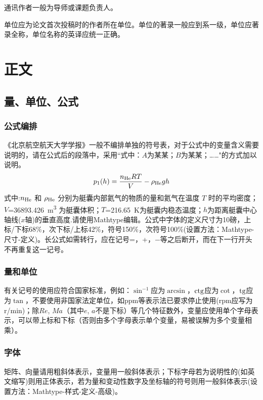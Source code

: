 \documentclass[10.5pt,twocolumn]{aaas}
\begin{document}
通讯作者一般为导师或课题负责人。

单位应为论文首次投稿时的作者所在单位。单位的著录一般应到系一级，单位应著录全称，单位名称的英译应统一正确。

\section{正文}
\subsection{量、单位、公式}
\subsubsection{公式编排}
\label{labSecForm}
《北京航空航天大学学报》一般不编排单独的符号表，对于公式中的变量含义需要说明的，请在公式后的段落中，采用``式中：$A$为某某；$B$为某某；……"的方式加以说明。
\begin{equation}
\label{eqnLabelp}
p_1 (h) = \dfrac{n_{\textnormal{He}}RT}{V}-\rho_{\textnormal{He}}gh
\end{equation}
式中:$n_{\textnormal{He}}$ 和 $\rho_{\textnormal{He}}$ 分别为艇囊内部氦气的物质的量和氦气在温度 $T$ 时的平均密度；
$V$=\SI{36893.426}{\cubic\meter}%
为艇囊体积；$T$=\SI{216.65}{\kelvin}为艇囊内稳态温度；$h$为距离艇囊中心轴线($x$轴)的垂直高度.请使用Mathtype编辑。公式中字体的定义尺寸为10磅，上标/下标68\%，次下标/上标42\%，符号150\%，次符号100\%(设置方法：Mathtype-尺寸-定义)。长公式如需转行，应在记号=，+，$-$等之后断开，而在下一行开头不再重复这一记号。

\subsubsection{量和单位}
有关记号的使用应符合国家标准，例如：$\sin^{-1}$应为$\arcsin$，$\rm ctg$应为$\cot$，$\rm tg$应为$\tan$，不要使用非国家法定单位，如ppm等表示法已要求停止使用(rpm应写为r/min)；除$Re$, $Ma$（其中$e$, $a$不是下标）等几个特征数外，变量应使用单个字母表示，可以带上标和下标（否则由多个字母表示单个变量，易被误解为多个变量相乘）。

\subsubsection{字体}
矩阵、向量请用粗斜体表示，变量用一般斜体表示；下标字母若为说明性的(如英文缩写)则用正体表示，若为量和变动性数字及坐标轴的符号则用一般斜体表示(设置方法：Mathtype-样式-定义-高级)。
\end{document}
